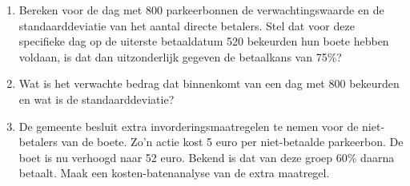 
\begin{enumerate}[label=(\alph*)]
    \item Bereken voor de dag met 800 parkeerbonnen de verwachtingswaarde en de standaarddeviatie van het aantal directe betalers.
    Stel dat voor deze specifieke dag op de uiterste betaaldatum 520 bekeurden hun boete hebben voldaan, is dat dan uitzonderlijk gegeven de betaalkans van 75\%?
    \answer{

    }

    \item Wat is het verwachte bedrag dat binnenkomt van een dag met 800 bekeurden en wat is de standaarddeviatie?
    \answer{
        
    }

    \item De gemeente besluit extra invorderingsmaatregelen te nemen voor de niet-betalers van de boete.
    Zo'n actie kost 5 euro per niet-betaalde parkeerbon.
    De boet is nu verhoogd naar 52 euro.
    Bekend is dat van deze groep 60\% daarna betaalt.
    Maak een kosten-batenanalyse van de extra maatregel.
    \answer{
        
    }
\end{enumerate}